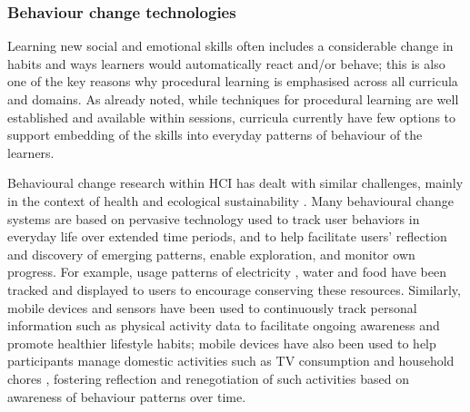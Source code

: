 \documentclass[prodmode,acmtochi]{acmsmall}
\begin{document}
                \subsubsection{Behaviour change technologies}
Learning new social and emotional skills often includes a considerable change in habits and ways learners would automatically react and/or behave; this is also one of the key reasons why procedural learning is emphasised across all curricula and domains. %
As already noted, while techniques for procedural learning are well established and available within sessions, curricula currently have few options to support embedding of the skills into everyday patterns of behaviour of the learners.

        
Behavioural change research within HCI has dealt with similar challenges, mainly in the context of health and ecological sustainability \cite{Hekler2013,Consolvo2009,Klasnja2011,Fitzpatrick2009}. %
Many behavioural change systems are based on pervasive technology used to track user behaviors in everyday life over extended time periods, and to help facilitate users' reflection and discovery of emerging patterns, enable exploration, and monitor own progress. For example, usage patterns of electricity \cite{Gustafsson2005}, water \cite{Kuznetsov2010} and food \cite{Ganglbauer2013} have been tracked and displayed to users to encourage conserving these resources.  Similarly, mobile devices and sensors have been used to continuously track personal information such as physical activity data  \cite{Lin2006a,Consolvo2008a} to facilitate ongoing awareness and promote healthier lifestyle habits; mobile devices have also been used to  help participants manage domestic activities such as TV consumption and household chores \cite{Reitberger2013}, fostering reflection and renegotiation of such activities based on awareness of behaviour patterns over time.
%
\end{document}
